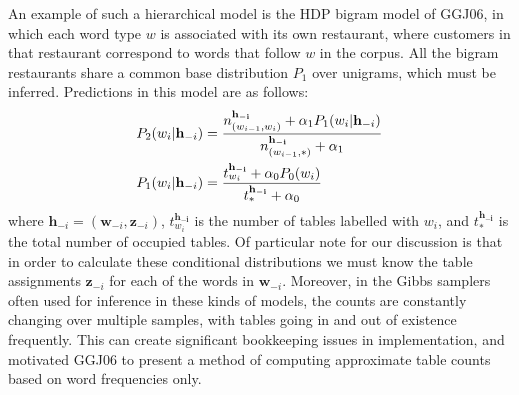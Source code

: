 \documentclass[11pt]{article}
\begin{document}
An example of such a hierarchical model is the HDP bigram model of
GGJ06, in which each word type $w$ is associated with its own
restaurant, where customers in that restaurant correspond to words
that follow $w$ in the corpus. All the bigram restaurants share a
common base distribution $P_1$ over unigrams, which must be inferred.
Predictions in this model are as follows:
\begin{align}
\small
\nonumber P_2(w_i | \mathbf{h}_{-i}) &= \frac{n_{(w_{i-1},w_i)}^{\mathbf{h_{-i}}} + \alpha_1 P_1(w_i | \mathbf{h}_{-i})}{n_{(w_{i-1}, *)}^{\mathbf{h_{-i}}} + \alpha_1} \\
 P_1(w_i | \mathbf{h}_{-i}) &= %
  \frac{t_{w_i}^{\mathbf{h_{-i}}} + \alpha_0 P_0(w_i)}{t_*^{\mathbf{h_{-i}}} + \alpha_0} \label{eq:hdp_p1}
\end{align}
where $\mathbf{h}_{-i} = (\mathbf{w}_{-i}, \mathbf{z}_{-i})$, $t_{w_i}^{\mathbf{h_{-i}}}$ is the number of tables labelled with $w_i$, and $t_*^{\mathbf{h_{-i}}}$ is the total number of occupied tables.
Of particular note for our discussion is that in order to calculate these conditional distributions we must know the table assignments $\mathbf{z}_{-i}$ for each of the words in $\mathbf{w}_{-i}$.  Moreover, in the Gibbs samplers often used for inference in these kinds of models, the counts are constantly changing over multiple samples, with tables going in and out of existence frequently.  This can create significant bookkeeping issues in implementation, and motivated GGJ06 to present a method of computing approximate table counts based on word frequencies only.
\end{document}
